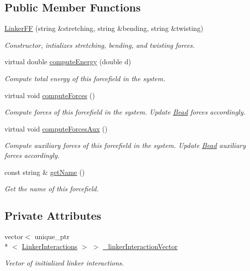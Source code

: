\subsection*{Public Member Functions}
\begin{DoxyCompactItemize}
\item 
\hyperlink{classLinkerFF_a348e1988dc5422bc9299b42a38232415}{Linker\+F\+F} (string \&stretching, string \&bending, string \&twisting)
\begin{DoxyCompactList}\small\item\em Constructor, intializes stretching, bending, and twisting forces. \end{DoxyCompactList}\item 
virtual double \hyperlink{classLinkerFF_a1556e1aef78dde85f5505bfa0f97758d}{compute\+Energy} (double d)
\begin{DoxyCompactList}\small\item\em Compute total energy of this forcefield in the system. \end{DoxyCompactList}\item 
virtual void \hyperlink{classLinkerFF_a16f7907979a7b285d08f83235d03e29b}{compute\+Forces} ()
\begin{DoxyCompactList}\small\item\em Compute forces of this forcefield in the system. Update \hyperlink{classBead}{Bead} forces accordingly. \end{DoxyCompactList}\item 
virtual void \hyperlink{classLinkerFF_a5dff1eaf63eb40bbd7af8e07bb1ee70f}{compute\+Forces\+Aux} ()
\begin{DoxyCompactList}\small\item\em Compute auxiliary forces of this forcefield in the system. Update \hyperlink{classBead}{Bead} auxiliary forces accordingly. \end{DoxyCompactList}\item 
const string \& \hyperlink{classForceField_a4a09e09603b4c4650dc7b3b0f0912fd2}{get\+Name} ()
\begin{DoxyCompactList}\small\item\em Get the name of this forcefield. \end{DoxyCompactList}\end{DoxyCompactItemize}
\subsection*{Private Attributes}
\begin{DoxyCompactItemize}
\item 
vector$<$ unique\+\_\+ptr\\*
$<$ \hyperlink{classLinkerInteractions}{Linker\+Interactions} $>$ $>$ \hyperlink{classLinkerFF_a003a6a92217997396600d9d78661e650}{\+\_\+linker\+Interaction\+Vector}
\begin{DoxyCompactList}\small\item\em Vector of initialized linker interactions. \end{DoxyCompactList}\end{DoxyCompactItemize}


